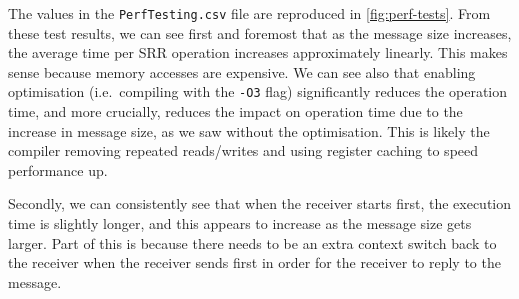 \documentclass[12pt, titlepage]{article}
\begin{document}
    The values in the \verb`PerfTesting.csv` file are reproduced in \autoref{fig:perf-tests}. From these test results, we can see first and foremost that as the message size increases, the average time per SRR operation increases approximately linearly. This makes sense because memory accesses are expensive. We can see also that enabling optimisation (i.e.\ compiling with the \verb`-O3` flag) significantly reduces the operation time, and more crucially, reduces the impact on operation time due to the increase in message size, as we saw without the optimisation. This is likely the compiler removing repeated reads/writes and using register caching to speed performance up.

    Secondly, we can consistently see that when the receiver starts first, the execution time is slightly longer, and this appears to increase as the message size gets larger. Part of this is because there needs to be an extra context switch back to the receiver when the receiver sends first in order for the receiver to reply to the message.
\end{document}

